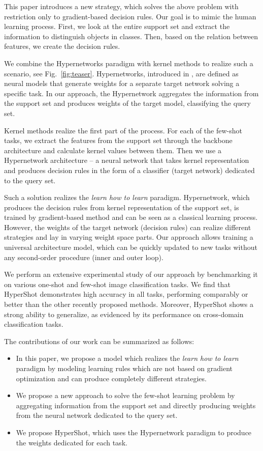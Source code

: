 \documentclass[nohyperref]{article}
\def\our{HyperShot}
\theoremstyle{plain}
\theoremstyle{definition}
\theoremstyle{remark}
\begin{document}
This paper introduces a new strategy, which solves the above problem with restriction only to gradient-based decision rules. Our goal is to mimic the human learning process. First, we look at the entire support set and extract the information to distinguish objects in classes. Then, based on the relation between features, we create the decision rules.

We combine the Hypernetworks paradigm with kernel methods to realize such a scenario, see Fig.~\ref{fig:teaser}.
Hypernetworks, introduced in \cite{ha2016hypernetworks}, are defined as neural models that generate weights for a separate target network solving a specific task.  In our approach, the Hypernetwork aggregates the information from the support set and produces weights of the target model, classifying the query set.


Kernel methods realize the first part of the process. For each of the few-shot tasks, we extract the features from the support set through the backbone architecture and calculate kernel values between them. Then we use a Hypernetwork architecture -- a neural network that takes kernel representation and produces decision rules in the form of a classifier (target network) dedicated to the query set.  

Such a solution realizes the \emph{learn how to learn} paradigm. Hypernetwork, which produces the decision rules from kernel representation of the support set, is trained by gradient-based method and can be seen as a classical learning process. However, the weights of the target network (decision rules) can realize different strategies and lay in varying weight space parts. Our approach allows training a universal architecture model, which can be quickly updated to new tasks without any second-order procedure (inner and outer loop).

We perform an extensive experimental study of our approach by benchmarking it on various one-shot and few-shot image classification tasks. We find that \our{} demonstrates high accuracy in all tasks, performing comparably or better than the other recently proposed methods. Moreover, \our{} shows a strong ability to generalize, as evidenced by its performance on cross-domain classification tasks. 

The contributions of our work can be summarized as follows:
\begin{itemize}
    \item In this paper, we propose a model which realizes the \emph{learn how to learn} paradigm by modeling learning rules which are not based on gradient optimization and can produce completely different strategies.
    \item We propose a new approach to solve the few-shot learning problem by aggregating information from the support set and directly producing weights from the neural network dedicated to the query set.
    \item We propose \our{}, which uses the Hypernetwork paradigm to produce the weights dedicated for each task. 
\end{itemize}
\end{document}
